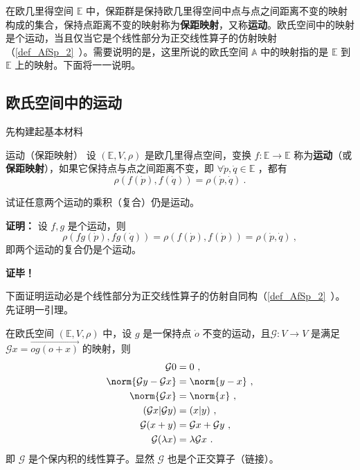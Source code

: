
\begin{issues}
\end{issues}

在欧几里得空间 $\mathbb E$ 中，保距群是保持欧几里得空间中点与点之间距离不变的映射构成的集合，保持点距离不变的映射称为\textbf{保距映射}，又称\textbf{运动}。欧氏空间中的映射是个运动，当且仅当它是个线性部分为正交线性算子的仿射映射（\autoref{def_AfSp_2}~）。需要说明的是，这里所说的欧氏空间 $\mathbb A$ 中的映射指的是 $\mathbb E$ 到 $\mathbb E$ 上的映射。下面将一一说明。
\subsection{欧氏空间中的运动}
先构建起基本材料
\begin{definition}{运动（保距映射）}
设 $(\mathbb E,V,\rho)$ 是欧几里得点空间，变换 $f:\mathbb E\rightarrow\mathbb E$ 称为\textbf{运动}（或\textbf{保距映射}），如果它保持点与点之间距离不变，即 $\forall \dot p,\dot q\in\mathbb E$ ，都有
\begin{equation}
\rho(f(\dot p),f(\dot q))=\rho(\dot p,\dot q)~.
\end{equation}
\end{definition}
\begin{example}{}\label{ex_CDQ2Ec_1}
试证任意两个运动的乘积（复合）仍是运动。

\textbf{证明：}
设 $f,g$ 是个运动，则
\begin{equation}
\rho(fg(\dot p),fg(\dot q))=\rho(f(\dot p),f(\dot p))=\rho(\dot p,\dot q)~,
\end{equation}
即两个运动的复合仍是个运动。

\textbf{证毕！}
\end{example}
下面证明运动必是个线性部分为正交线性算子的仿射自同构（\autoref{def_AfSp_2}~）。先证明一引理。
\begin{lemma}{}\label{lem_CDQ2Ec_1}
在欧氏空间 $(\mathbb E,V,\rho)$ 中，设 $g$ 是一保持点 $\dot o$ 不变的运动，且$\mathcal G:V\rightarrow V$ 是满足 $\mathcal G x=\overrightarrow{og(o+x)}$ 的映射，则
\begin{equation}
\begin{aligned}
\mathcal G 0&=0~,\\
\norm{\mathcal Gy-\mathcal Gx}&=\norm{y-x}~,\\
\norm{\mathcal G x}&=\norm{x}~,\\
(\mathcal G x|\mathcal G y)&=(x|y)~,\\
\mathcal G(x+y)&=\mathcal G x+\mathcal G y~,\\
\mathcal G(\lambda x)&=\lambda\mathcal G x~.
\end{aligned}
\end{equation}
即 $\mathcal G$ 是个保内积的线性算子。显然 $\mathcal G$ 也是个正交算子（链接）。
\end{lemma}
